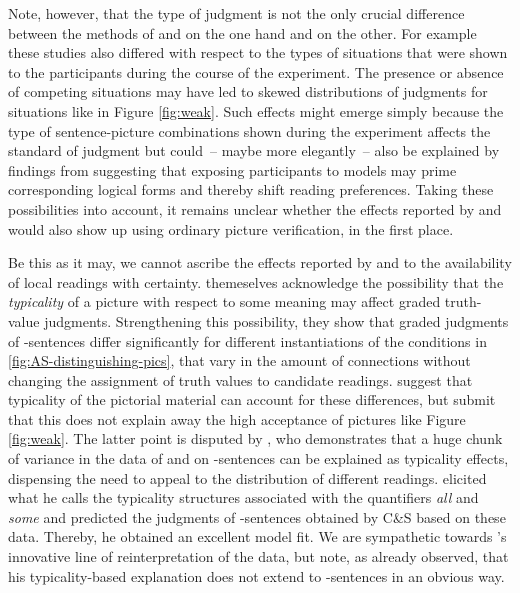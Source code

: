 \documentclass[fleqn,reqno,10pt,draft]{article}
\newcommand{\as}{\acro{as}}
\renewcommand{\es}{\acro{es}}
\begin{document}
Note, however, that the type of judgment  is not the only crucial difference between the methods of \citeauthor{CliftonDube2010:Embedded-Implic} and \citeauthor{ChemlaSpector2010:Experimental-Ev} on the one hand and  \citet{GeurtsPouscoulous2009:Embedded-Implic} on the other. For example these studies  also differed with respect to the types of situations that were shown to the participants during the course of the experiment.  The presence or absence of competing situations may have led to skewed distributions of judgments for situations like in Figure \ref{fig:weak}. Such effects might emerge simply because the type of sentence-picture combinations shown during the experiment affects the standard of judgment but could~-- maybe more elegantly~-- also be explained by findings from \citet{Raffray2010} suggesting that exposing participants to models may prime corresponding logical forms and thereby shift reading preferences. Taking these possibilities into account, it remains unclear whether the effects reported by  \citeauthor{CliftonDube2010:Embedded-Implic} and \citeauthor{ChemlaSpector2010:Experimental-Ev} would also show up using ordinary picture verification, in the first place.   

Be this as it may, we cannot ascribe the effects reported by  \citeauthor{CliftonDube2010:Embedded-Implic} and \citeauthor{ChemlaSpector2010:Experimental-Ev} to the availability of local readings with certainty. \citet{ChemlaSpector2010:Experimental-Ev} themeselves acknowledge
the possibility that the \emph{typicality} of a picture with respect to some meaning may affect graded truth-value
judgments. Strengthening this possibility, they show that graded judgments of
\as-sentences differ significantly for different instantiations of the
conditions in \ref{fig:AS-distinguishing-pics}, that vary in the
amount of connections without changing the assignment of truth values
to candidate readings. \citeauthor{ChemlaSpector2010:Experimental-Ev}
suggest that typicality of the pictorial material can account for
these differences, but submit that this does not explain away the
high acceptance of pictures like Figure \ref{fig:weak}. The latter point is disputed by
\citet{Tielvan-Tiel2012:Embedded-Scalar}, who demonstrates that a huge chunk of variance in the data of
\citeauthor{CliftonDube2010:Embedded-Implic} and \citeauthor{ChemlaSpector2010:Experimental-Ev} on
\as-sentences can be explained as typicality effects, dispensing the need to appeal
to the distribution of different readings. \citet{Tielvan-Tiel2012:Embedded-Scalar} elicited what he calls the typicality
structures associated with the quantifiers {\it all} and {\it some} and predicted the judgments of \as-sentences obtained by C\&S based
on these data. Thereby, he obtained an excellent model fit. We are sympathetic towards
\citeauthor{Tielvan-Tiel2012:Embedded-Scalar}'s innovative line of
reinterpretation of the data, but note, as
\citet{ChemlaSpector2010:Experimental-Ev} already observed, that his
typicality-based explanation does not extend to \es-sentences in an
obvious way.
\end{document}
